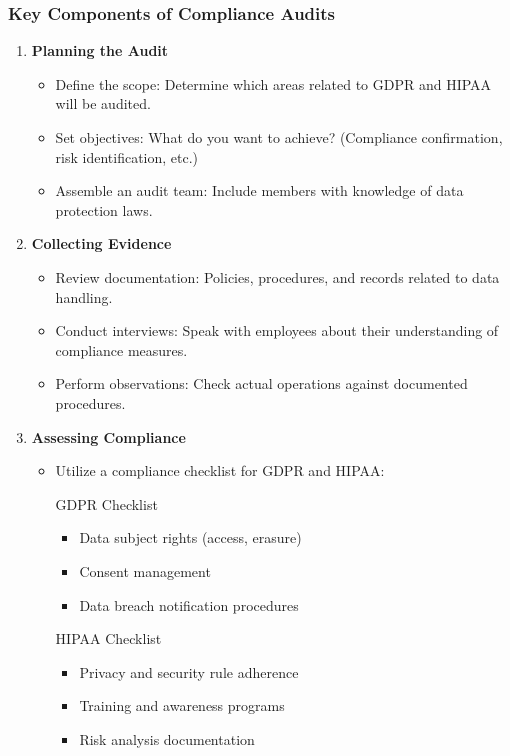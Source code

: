 \documentclass{beamer}
\begin{document}
\begin{frame}[fragile]
    \frametitle{Key Components of Compliance Audits}
    \begin{enumerate}
        \item \textbf{Planning the Audit}
            \begin{itemize}
                \item Define the scope: Determine which areas related to GDPR and HIPAA will be audited.
                \item Set objectives: What do you want to achieve? (Compliance confirmation, risk identification, etc.)
                \item Assemble an audit team: Include members with knowledge of data protection laws.
            \end{itemize}
        
        \item \textbf{Collecting Evidence}
            \begin{itemize}
                \item Review documentation: Policies, procedures, and records related to data handling.
                \item Conduct interviews: Speak with employees about their understanding of compliance measures.
                \item Perform observations: Check actual operations against documented procedures.
            \end{itemize}

        \item \textbf{Assessing Compliance}
            \begin{itemize}
                \item Utilize a compliance checklist for GDPR and HIPAA:
                    \begin{block}{GDPR Checklist}
                        \begin{itemize}
                            \item Data subject rights (access, erasure)
                            \item Consent management
                            \item Data breach notification procedures
                        \end{itemize}
                    \end{block}
                    \begin{block}{HIPAA Checklist}
                        \begin{itemize}
                            \item Privacy and security rule adherence
                            \item Training and awareness programs
                            \item Risk analysis documentation
                        \end{itemize}
                    \end{block}
            \end{itemize}
    \end{enumerate}
\end{frame}
\end{document}
